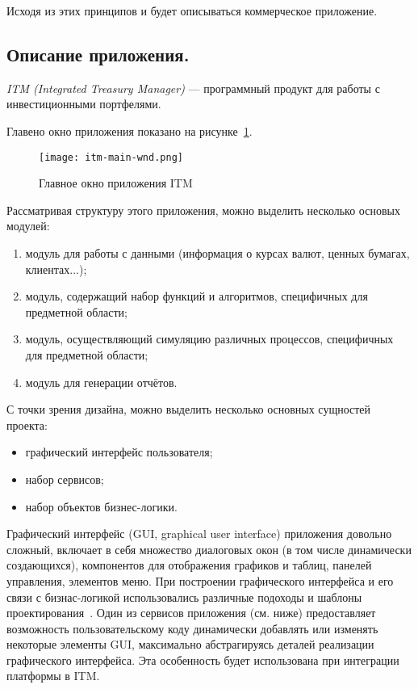 Исходя из этих принципов и будет описываться коммерческое приложение.

\subsection{Описание приложения.}

{\it ITM (Integrated Treasury Manager)} --- программный продукт для работы с инвестиционными портфелями. 

Главено окно приложения показано на рисунке~\ref{pic:itm-main-wnd}.
\begin{figure}[!h]
    \centering
    \texttt{[image: itm-main-wnd.png]}
    \caption{Главное окно приложения ITM}
    \label{pic:itm-main-wnd}
\end{figure}

Рассматривая структуру этого приложения, можно выделить несколько основых модулей:
\begin{enumerate}
 \item модуль для работы с данными (информация о курсах валют, ценных бумагах, клиентах...);
 \item модуль, содержащий набор функций и алгоритмов, специфичных для предметной области;
 \item модуль, осуществляющий симуляцию различных процессов, специфичных для предметной области;
 \item модуль для генерации отчётов.
\end{enumerate}

С точки зрения дизайна, можно выделить несколько основных сущностей проекта:
\begin{itemize}
 \item графический интерфейс пользователя; 
 \item набор сервисов;
 \item набор объектов бизнес-логики.
\end{itemize}

Графический интерфейс (GUI, graphical user interface) приложения довольно сложный, включает в себя множество диалоговых окон (в том числе динамически создающихся), компонентов для отображения графиков и таблиц, панелей управления, элементов меню. При построении графического интерфейса и его связи с бизнас-логикой использовались различные подоходы и шаблоны проектирования~\cite{band-four}. Один из сервисов приложения (см. ниже) предоставляет возможность пользовательскому коду динамически добавлять или изменять некоторые элементы GUI, максимально абстрагируясь деталей реализации графического интерфейса. Эта особенность будет использована при интеграции платформы в ITM.


